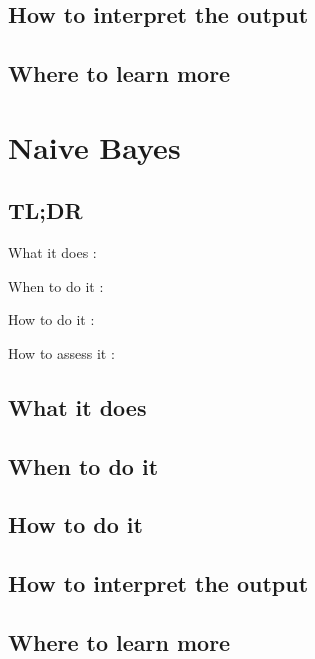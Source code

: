 \documentclass[
]{book}
\begin{document}
\hypertarget{how-to-interpret-the-output-5}{%
\section{How to interpret the output}\label{how-to-interpret-the-output-5}}

\hypertarget{where-to-learn-more-5}{%
\section{Where to learn more}\label{where-to-learn-more-5}}

\hypertarget{naive-bayes}{%
\chapter{Naive Bayes}\label{naive-bayes}}

\hypertarget{tldr-6}{%
\section{TL;DR}\label{tldr-6}}

What it does
:

When to do it
:

How to do it
:

How to assess it
:

\hypertarget{what-it-does-6}{%
\section{What it does}\label{what-it-does-6}}

\hypertarget{when-to-do-it-6}{%
\section{When to do it}\label{when-to-do-it-6}}

\hypertarget{how-to-do-it-6}{%
\section{How to do it}\label{how-to-do-it-6}}

\hypertarget{how-to-interpret-the-output-6}{%
\section{How to interpret the output}\label{how-to-interpret-the-output-6}}

\hypertarget{where-to-learn-more-6}{%
\section{Where to learn more}\label{where-to-learn-more-6}}
\end{document}
